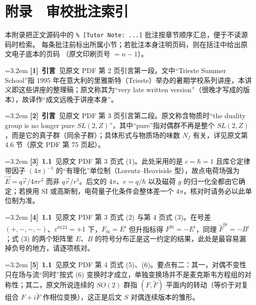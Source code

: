 \newpage
\section*{附录　审校批注索引}
\noindent\small
本附录把正文源码中的 \verb|% [Tutor Note: ...]| 批注按章节顺序汇总，便于不读源码时检索。
每条批注前标出所属小节；若批注本身注明页码，则在括注中给出原文电子底本的页码
（原文印刷页号 $=n-1$）。
\normalsize

\par\medskip\noindent\hangindent=3.2em \textbf{[1]}~\textbf{引言}~见原文 PDF 第 2 页引言第一段。文中“Trieste Summer School”指 1995 年在意大利的里雅斯特（Trieste）举办的暑期学校系列讲座，本讲义即这些讲座的整理稿；原文称其为“very late written version”（很晚才写成的版本），故译作“成文远晚于讲座本身”。
\par
\par\medskip\noindent\hangindent=3.2em \textbf{[2]}~\textbf{引言}~见原文 PDF 第 3 页引言第二段。原文称含物质时“the duality group is no longer pure $SL(2,Z)$”，其中“pure”指对偶群不再是整个 $SL(2,Z)$，而是它的真子群（同余子群）；具体形式与物质场的味数 $N_f$ 有关，详见原文第 4.6 节（原文 PDF 第 75 页起）。
\par
\par\medskip\noindent\hangindent=3.2em \textbf{[3]}~\textbf{1.1}~见原文 PDF 第 3 页式 (1)。此处采用的是 $c=\hbar=1$ 且库仑定律带因子 $(4\pi)^{-1}$ 的“有理化”单位制（Lorentz–Heaviside 型），故点电荷场强为 $\vec{E}=q\vec{r}/4\pi r^{3}$ 而非 $q\vec{r}/r^{3}$。后文的 $4\pi$、$e=q/\hbar$ 以及磁荷 $g$ 的归一化全都由它确定；若换用 SI 或高斯制，电荷量子化条件会整体差一个 $4\pi$，核对时请务必以此单位制为准。
\par
\par\medskip\noindent\hangindent=3.2em \textbf{[4]}~\textbf{1.1}~见原文 PDF 第 3 页式 (2) 与第 4 页式 (3)。在号差 $(+,-,-,-)$、$\varepsilon^{0123}=+1$ 下，$F_{0i}=E^i$ 但升指标得 $F^{0i}=-E^i$，同理 $\widetilde F^{0i}=-B^i$；式 (3) 的两个矩阵里 $E$、$B$ 的符号分布正是这一约定的结果，此处是最容易漏掉负号的地方，请逐项核对。
\par
\par\medskip\noindent\hangindent=3.2em \textbf{[5]}~\textbf{1.1}~见原文 PDF 第 4 页式 (5)、(6)。要点有二：其一，对偶不变性只在场与流“同时”按式 (6) 变换时才成立，单独变换场并不是麦克斯韦方程组的对称性；其二，原文所说连续的 $SO(2)$ 群指 $(F,\widetilde F)$ 平面内的转动（等价于对复组合 $F+i\widetilde F$ 作相位变换），这正是后文 $S$ 对偶连续版本的雏形。

